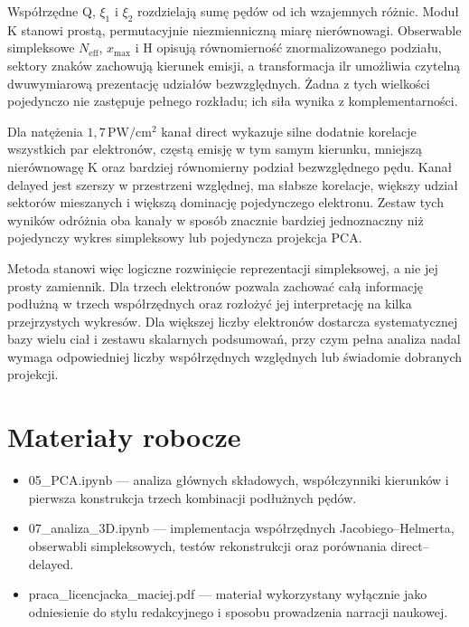 \documentclass[12pt,letterpaper,oneside]{report}
\numberwithin{equation}{chapter}
\numberwithin{figure}{chapter}
\numberwithin{table}{chapter}
\newcommand{\Neff}{\ensuremath{N_{\mathrm{eff}}}}
\newcommand{\xmax}{\ensuremath{x_{\max}}}
\begin{document}
Współrzędne Q, \ensuremath{\xi_1} i \ensuremath{\xi_2} rozdzielają sumę pędów od ich wzajemnych różnic.
Moduł K stanowi prostą, permutacyjnie niezmienniczną miarę nierównowagi.
Obserwable simpleksowe \Neff{}, \xmax{} i H opisują równomierność
znormalizowanego podziału, sektory znaków zachowują kierunek emisji, a
transformacja ilr umożliwia czytelną dwuwymiarową prezentację udziałów
bezwzględnych. Żadna z tych wielkości pojedynczo nie zastępuje pełnego
rozkładu; ich siła wynika z komplementarności.

Dla natężenia \ensuremath{1{,}7\,\mathrm{PW/cm^2}} kanał direct wykazuje silne dodatnie korelacje
wszystkich par elektronów, częstą emisję w tym samym kierunku, mniejszą
nierównowagę K oraz bardziej równomierny podział bezwzględnego pędu.
Kanał delayed jest szerszy w przestrzeni względnej, ma słabsze
korelacje, większy udział sektorów mieszanych i większą dominację
pojedynczego elektronu. Zestaw tych wyników odróżnia oba kanały w sposób
znacznie bardziej jednoznaczny niż pojedynczy wykres simpleksowy lub
pojedyncza projekcja PCA.

Metoda stanowi więc logiczne rozwinięcie reprezentacji simpleksowej, a
nie jej prosty zamiennik. Dla trzech elektronów pozwala zachować całą
informację podłużną w trzech współrzędnych oraz rozłożyć jej
interpretację na kilka przejrzystych wykresów. Dla większej liczby
elektronów dostarcza systematycznej bazy wielu ciał i zestawu skalarnych
podsumowań, przy czym pełna analiza nadal wymaga odpowiedniej liczby
współrzędnych względnych lub świadomie dobranych projekcji.

\chapter*{Materiały robocze}

\begin{itemize}
\item
  05\_PCA.ipynb --- analiza głównych składowych, współczynniki kierunków
  i pierwsza konstrukcja trzech kombinacji podłużnych pędów.
\item
  07\_analiza\_3D.ipynb --- implementacja współrzędnych
  Jacobiego--Helmerta, obserwabli simpleksowych, testów rekonstrukcji
  oraz porównania direct--delayed.
\item
  praca\_licencjacka\_maciej.pdf --- materiał wykorzystany wyłącznie
  jako odniesienie do stylu redakcyjnego i sposobu prowadzenia narracji
  naukowej.
\end{itemize}
\end{document}
